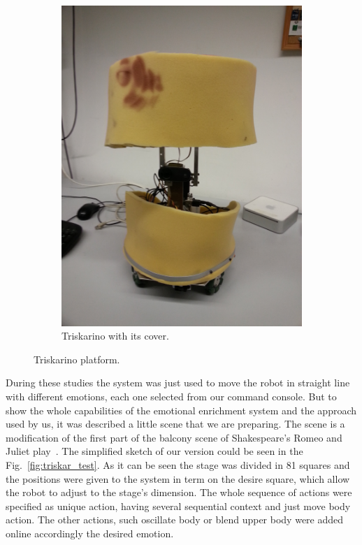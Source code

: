 \begin{figure}
\begin{subfigure}[c]{0.2\textwidth}
	\includegraphics[width=\textwidth]{./Images/platform_fome.jpg}
	\caption{Triskarino with its cover.}
	\label{fig:triskar}
	\end{subfigure}
	\caption{Triskarino platform.}
	\label{fig:robot}
\end{figure}  
 During these studies the system was just used to move the robot in straight line with different emotions, each one selected from our command console. But to show the whole capabilities of the emotional enrichment system and the approach used by us, it was described a little scene that we are preparing. The scene is a modification of the first part of the balcony scene of Shakespeare's Romeo and Juliet play~\cite{RAndJ}. The simplified sketch of our version could be seen in the Fig.~\ref{fig:triskar_test}. As it can be seen the stage was divided in 81 squares and the positions were given to the system in term on the desire square, which allow the robot to adjust to the stage's dimension. The whole sequence of actions were specified as unique action, having several sequential context and just move body action. The other actions, such oscillate body or blend upper body were added online accordingly the desired emotion.  
